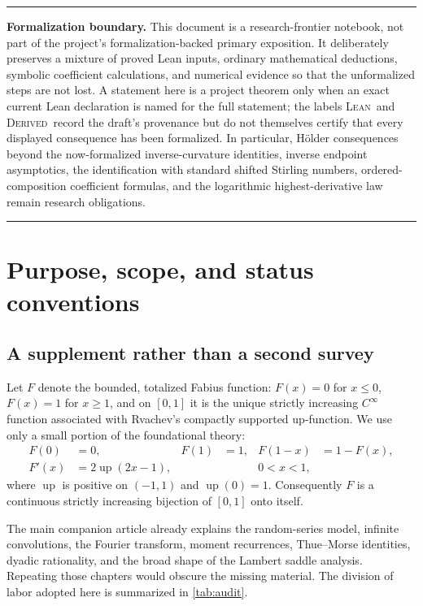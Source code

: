 \documentclass[11pt,oneside]{article}
\theoremstyle{definition}
\theoremstyle{remark}
\newcommand{\Up}{\operatorname{up}}
\newenvironment{boxedremark}{%
  \par\smallskip\noindent\begin{center}\begin{minipage}{0.94\textwidth}%
  \color{black}\hrule\vspace{0.6em}\small
}{%
  \vspace{0.6em}\hrule\end{minipage}\end{center}\smallskip
}
\newcommand{\Formalized}{\textsc{Lean}}
\newcommand{\Derived}{\textsc{Derived}}
\begin{document}
\begin{boxedremark}
\textbf{Formalization boundary.}
This document is a research-frontier notebook, not part of the project's
formalization-backed primary exposition.  It deliberately preserves a mixture of proved
Lean inputs, ordinary mathematical deductions, symbolic coefficient calculations, and
numerical evidence so that the unformalized steps are not lost.  A statement here is a
project theorem only when an exact current Lean declaration is named for the full statement;
the labels \Formalized\ and \Derived\ record the draft's provenance but do not themselves
certify that every displayed consequence has been formalized.  In particular, H\"older
consequences beyond the now-formalized inverse-curvature identities, inverse endpoint
asymptotics, the identification with
standard shifted Stirling numbers, ordered-composition coefficient formulas, and the
logarithmic highest-derivative law remain research obligations.
\end{boxedremark}

\tableofcontents
\clearpage

\section{Purpose, scope, and status conventions}

\subsection{A supplement rather than a second survey}

Let $F$ denote the bounded, totalized Fabius function: $F(x)=0$ for
$x\leq0$, $F(x)=1$ for $x\geq1$, and on $[0,1]$ it is the unique strictly
increasing $C^\infty$ function associated with Rvachev's compactly
supported up-function.  We use only a small portion of the foundational
theory:
\begin{align}
 F(0)&=0,&F(1)&=1,&F(1-x)&=1-F(x), \label{eq:F-basic}\\
 F'(x)&=2\Up(2x-1),&&&0<x<1, \label{eq:Fprime-up}
\end{align}
where $\Up$ is positive on $(-1,1)$ and $\Up(0)=1$.  Consequently $F$ is a
continuous strictly increasing bijection of $[0,1]$ onto itself.

The main companion article already explains the random-series model,
infinite convolutions, the Fourier transform, moment recurrences,
Thue--Morse identities, dyadic rationality, and the broad shape of the
Lambert saddle analysis.  Repeating those chapters would obscure the
missing material.  The division of labor adopted here is summarized in
\cref{tab:audit}.
\end{document}
